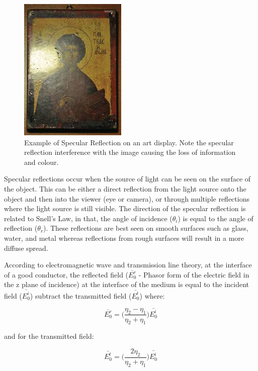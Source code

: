 \documentclass[fleqn,twoside,12pt]{report}
\begin{document}
\begin{figure}[h]
	\centering
	\includegraphics[scale=0.9]{specular_art.jpg}
	\caption{Example of Specular Reflection on an art display. Note the specular reflection interference with the image causing the loss of information and colour.}
	\label{fig:specular_art}
\end{figure}


Specular reflections occur when the source of light can be seen on the surface of the object. This can be either a direct reflection from the light source onto the object and then into the viewer (eye or camera), or through multiple reflections where the light source is still visible. The direction of the specular reflection is related to Snell's Law, in that, the angle of incidence ($\theta_i$) is equal to the angle of reflection ($\theta_r$). These reflections are best seen on smooth surfaces such as glass, water, and metal whereas reflections from rough surfaces will result in a more diffuse spread.   

According to electromagnetic wave and transmission line theory, at the interface of a good conductor, the reflected field ($\bar{E_0^r}$ - Phasor form of the electric field in the z plane of incidence) at the interface of the medium is equal to the incident field ($\bar{E_0^i}$) subtract the transmitted field ($\bar{E_0^t}$) \cite{ulaby} where:

\begin{equation}
\bar{E_0^r} = \bigg(\frac{\eta_2 - \eta_1}{\eta_2 + \eta_1}\bigg)\bar{E_0^i}
\end{equation}

and for the transmitted field:

\begin{equation}
\bar{E_0^t} = \bigg(\frac{2\eta_2}{\eta_2 + \eta_1}\bigg)\bar{E_0^i}
\end{equation}
\end{document}
